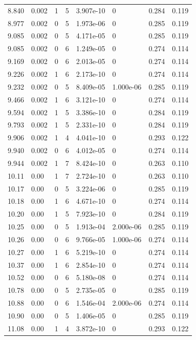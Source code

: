 \documentclass[preview]{standalone}
\begin{document}
{{{\begin{tabular}{L{1.2cm}C{1.2cm} C{0.3cm}C{0.5cm} C{1.4cm}C{1.4cm} C{1.4cm}C{1.4cm}}
  8.840  &  0.002  & 1     &  5 &  3.907e-10  & 0  & 0.284 &  0.119   \\ 
  8.977  &  0.002  & 0     &  5 &  1.973e-06  & 0  & 0.285 &  0.119   \\ 
  9.085  &  0.002  & 0     &  5 &  4.171e-05  & 0  & 0.285 &  0.119   \\ 
  9.085  &  0.002  & 0     &  6 &  1.249e-05  & 0  & 0.274 &  0.114   \\ 
  9.169  &  0.002  & 0     &  6 &  2.013e-05  & 0  & 0.274 &  0.114   \\ 
  9.226  &  0.002  & 1     &  6 &  2.173e-10  & 0  & 0.274 &  0.114   \\ 
  9.232  &  0.002  & 0     &  5 &  8.409e-05  & 1.000e-06  & 0.285 &  0.119   \\ 
  9.466  &  0.002  & 1     &  6 &  3.121e-10  & 0  & 0.274 &  0.114   \\ 
  9.594  &  0.002  & 1     &  5 &  3.386e-10  & 0  & 0.284 &  0.119   \\ 
  9.793  &  0.002  & 1     &  5 &  2.331e-10  & 0  & 0.284 &  0.119   \\ 
  9.906  &  0.002  & 1     &  4 &  4.041e-10  & 0  & 0.293 &  0.122   \\ 
  9.940  &  0.002  & 0     &  6 &  4.012e-05  & 0  & 0.274 &  0.114   \\ 
  9.944  &  0.002  & 1     &  7 &  8.424e-10  & 0  & 0.263 &  0.110   \\ 
  10.11  &  0.00  & 1     &  7 &  2.724e-10  & 0  & 0.263 &  0.110   \\ 
  10.17  &  0.00  & 0     &  5 &  3.224e-06  & 0  & 0.285 &  0.119   \\ 
  10.18  &  0.00  & 1     &  6 &  4.671e-10  & 0  & 0.274 &  0.114   \\ 
  10.20  &  0.00  & 1     &  5 &  7.923e-10  & 0  & 0.284 &  0.119   \\ 
  10.25  &  0.00  & 0     &  5 &  1.913e-04  & 2.000e-06  & 0.285 &  0.119   \\ 
  10.26  &  0.00  & 0     &  6 &  9.766e-05  & 1.000e-06  & 0.274 &  0.114   \\ 
  10.27  &  0.00  & 1     &  6 &  5.219e-10  & 0  & 0.274 &  0.114   \\ 
  10.37  &  0.00  & 1     &  6 &  2.854e-10  & 0  & 0.274 &  0.114   \\ 
  10.52  &  0.00  & 0     &  6 &  5.180e-08  & 0  & 0.274 &  0.114   \\ 
  10.78  &  0.00  & 0     &  5 &  2.735e-05  & 0  & 0.285 &  0.119   \\ 
  10.88  &  0.00  & 0     &  6 &  1.546e-04  & 2.000e-06  & 0.274 &  0.114   \\ 
  10.90  &  0.00  & 0     &  5 &  1.406e-05  & 0  & 0.285 &  0.119   \\ 
  11.08  &  0.00  & 1     &  4 &  3.872e-10  & 0  & 0.293 &  0.122   \\ 
\hline 
\end{tabular} 

}}}
\end{document}
